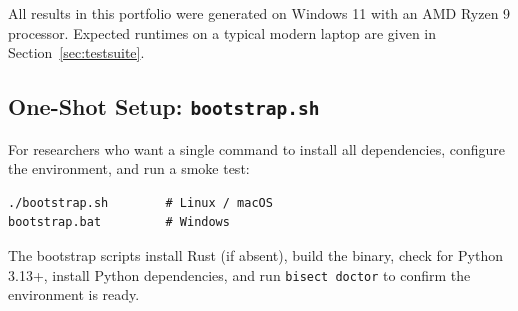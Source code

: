 \noindent All results in this portfolio were generated on Windows 11
with an AMD Ryzen 9 processor.
Expected runtimes on a typical modern laptop are given in
Section~\ref{sec:testsuite}.

\subsection*{One-Shot Setup: \texttt{bootstrap.sh}}

For researchers who want a single command to install all dependencies,
configure the environment, and run a smoke test:

\begin{verbatim}
./bootstrap.sh        # Linux / macOS
bootstrap.bat         # Windows
\end{verbatim}

\noindent The bootstrap scripts install Rust (if absent), build the binary,
check for Python 3.13+, install Python dependencies,
and run \texttt{bisect doctor} to confirm the environment is ready.
